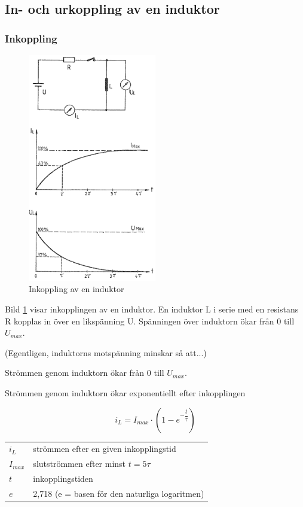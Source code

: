 \subsection{In- och urkoppling av en induktor}

\subsubsection{Inkoppling}

\begin{figure}
\includegraphics[width=0.5\textwidth]{images/cropped_pdfs/bild_2_3-10.pdf}
\caption{Inkoppling av en induktor}
\label{fig:BildII3-10}
\end{figure}

Bild \ref{fig:BildII3-10} visar inkopplingen av en induktor.
En induktor L i serie med en resistans R kopplas in över en likspänning U.
Spänningen över induktorn ökar från 0 till \(U_{max}\).

(Egentligen, induktorns motspänning minskar så att...)

Strömmen genom induktorn ökar från 0 till \(U_{max}\).

Strömmen genom induktorn ökar exponentiellt efter inkopplingen

\[i_L = I_{max} \cdot (1-e^{-\dfrac{t}{\tau}} )\]

\begin{tabular}{lp{}}
  \(i_L\) &  strömmen efter en given inkopplingstid \\
  \(I_{max}\) & slutströmmen efter minst \(t = 5\tau\) \\
  \(t\) & inkopplingstiden \\
  \(e\) & 2,718 (e = basen för den naturliga logaritmen) \\
\end{tabular}

